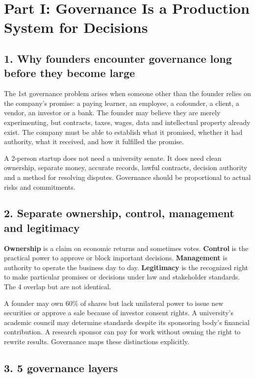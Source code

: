 \section*{Part I: Governance Is a Production System for Decisions}

\subsection{1. Why founders encounter governance long before they become large}

The 1st governance problem arises when someone other than the founder relies on the company's promise: a paying learner, an employee, a cofounder, a client, a vendor, an investor or a bank. The founder may believe they are merely experimenting, but contracts, taxes, wages, data and intellectual property already exist. The company must be able to establish what it promised, whether it had authority, what it received, and how it fulfilled the promise.

A 2-person startup does not need a university senate. It does need clean ownership, separate money, accurate records, lawful contracts, decision authority and a method for resolving disputes. Governance should be proportional to actual risks and commitments.

\subsection{2. Separate ownership, control, management and legitimacy}

\textbf{Ownership} is a claim on economic returns and sometimes votes. \textbf{Control} is the practical power to approve or block important decisions. \textbf{Management} is authority to operate the business day to day. \textbf{Legitimacy} is the recognized right to make particular promises or decisions under law and stakeholder standards. The 4 overlap but are not identical.

A founder may own 60\% of shares but lack unilateral power to issue new securities or approve a sale because of investor consent rights. A university's academic council may determine standards despite its sponsoring body's financial contribution. A research sponsor can pay for work without owning the right to rewrite results. Governance maps these distinctions explicitly.

\subsection{3. 5 governance layers}

